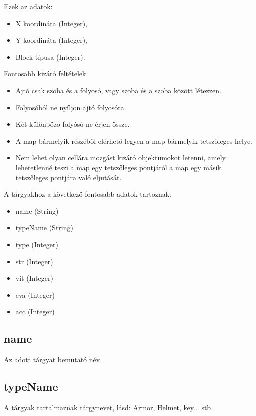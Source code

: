 \noindent Ezek az adatok:

\begin{itemize}
    \item X koordináta (Integer),
    \item Y koordináta (Integer),
    \item Block típusa (Integer).
\end{itemize}

\noindent Fontosabb kizáró feltételek:

\begin{itemize}
    \item Ajtó csak szoba és a folyosó, vagy szoba és a szoba között létezzen.
    \item Folyosóból ne nyíljon ajtó folyosóra.
    \item Két különböző folyósó ne érjen össze.
    \item A map bármelyik részéből elérhető legyen a map bármelyik tetszőleges helye.
    \item Nem lehet olyan cellára mozgást kizáró objektumokot letenni, amely lehetetlenné teszi a map egy tetszőleges pontjáról a map egy másik tetszőleges pontjára való eljutását.
\end{itemize}


A tárgyakhoz a következő fontosabb adatok tartoznak:
\begin{itemize}
    \item name (String)
    \item typeName (String)
    \item type (Integer)
    \item str (Integer)
    \item vit (Integer)
    \item eva (Integer)
    \item acc (Integer)
\end{itemize}

\subsection{name}

Az adott tárgyat bemutató név.

\subsection{typeName}

A tárgyak tartalmaznak tárgynevet, lásd: Armor, Helmet, key... stb.

